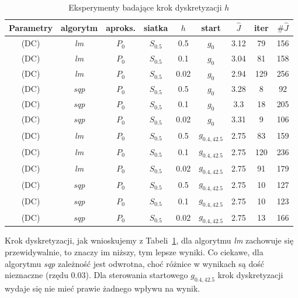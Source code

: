 \documentclass[11pt]{article}
\begin{document}
\begin{table}[h]
  \begin{center}
    \begin{tabular}{|c|c|c|c|c|c|c|c|c|}
      \hline
      Parametry & algorytm & aproks. & siatka & $h$ & start & $\hat{J}$ & iter & $\#\hat{J}$ \\
      \hline
      (DC) & {\it lm\/} & $P_0$ & $S_{0.5}$ & 0.5 & $g_0$ & 3.12 & 79 & 156 \\
      \hline
      (DC) & {\it lm\/} & $P_0$ & $S_{0.5}$ & 0.1 & $g_0$ & 3.04 & 81 & 158 \\
      \hline
      (DC) & {\it lm\/} & $P_0$ & $S_{0.5}$ & 0.02 & $g_0$ & 2.94 & 129 & 256 \\
      \hline
      (DC) & {\it sqp\/} & $P_0$ & $S_{0.5}$ & 0.5 & $g_0$ & 3.28 & 8 & 92 \\
      \hline
      (DC) & {\it sqp\/} & $P_0$ & $S_{0.5}$ & 0.1 & $g_0$ & 3.3 & 18 & 205 \\
      \hline
      (DC) & {\it sqp\/} & $P_0$ & $S_{0.5}$ & 0.02 & $g_0$ & 3.31 & 9 & 106 \\
      \hline
      (DC) & {\it lm\/} & $P_0$ & $S_{0.5}$ & 0.5 & $g_{0.4,42.5}$ & 2.75 & 83 & 159 \\
      \hline
      (DC) & {\it lm\/} & $P_0$ & $S_{0.5}$ & 0.1 & $g_{0.4,42.5}$ & 2.75 & 120 & 236 \\
      \hline
      (DC) & {\it lm\/} & $P_0$ & $S_{0.5}$ & 0.02 & $g_{0.4,42.5}$ & 2.75 & 91 & 179 \\
      \hline
      (DC) & {\it sqp\/} & $P_0$ & $S_{0.5}$ & 0.5 & $g_{0.4,42.5}$ & 2.75 & 10 & 127 \\
      \hline
      (DC) & {\it sqp\/} & $P_0$ & $S_{0.5}$ & 0.1 & $g_{0.4,42.5}$ & 2.75 & 10 & 123 \\
      \hline
      (DC) & {\it sqp\/} & $P_0$ & $S_{0.5}$ & 0.02 & $g_{0.4,42.5}$ & 2.75 & 13 & 166 \\
      \hline
    \end{tabular}
    \caption{Eksperymenty badające krok dyskretyzacji $h$}\label{step_tbl}
  \end{center}
\end{table}

Krok dyskretyzacji, jak wnioskujemy z Tabeli~\ref{step_tbl}, dla algorytmu {\it lm\/} zachowuje się przewidywalnie, to znaczy im niższy, tym lepsze wyniki. Co ciekawe, dla algorytmu {\it sqp\/} zależność jest odwrotna, choć różnice w wynikach są dość nieznaczne (rzędu $0.03$). Dla sterowania startowego $g_{0.4,42.5}$ krok dyskretyzacji wydaje się nie mieć prawie żadnego wpływu na wynik.
\end{document}
